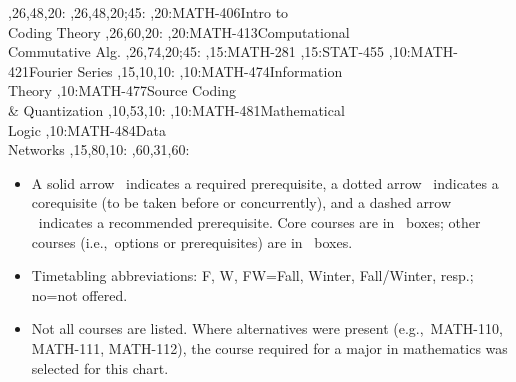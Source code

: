 \documentclass[9pt]{extarticle}
\begin{document}
\begin{chart}
  ,26,48,20:
  ,26,48,20;45:
,20:{MATH-406}{Intro to\\Coding Theory}{}
  ,26,60,20:
,20:{MATH-413}{Computational\\Commutative Alg.}{}
  ,26,74,20;45:
,15:{MATH-281}
,15:{STAT-455}
,10:{MATH-421}{Fourier Series}{}
  ,15,10,10:
,10:{MATH-474}{Information\\Theory}{}
,10:{MATH-477}{Source Coding\\\& Quantization}{}
  ,10,53,10:
,10:{MATH-481}{Mathematical\\Logic}{}
,10:{MATH-484}{Data\\Networks}{}
  ,15,80,10:
  ,60,31,60:
\end{chart}
\begin{center}
\begin{minipage}{6.0in}
\begin{itemize}
\item
A solid arrow \solidarrow\  indicates a required prerequisite,
a dotted arrow \dottedarrow\
indicates a corequisite (to be taken before or concurrently), and a
dashed arrow \dashedarrow\ indicates a recommended prerequisite.
Core courses are in \boldbox\ boxes;
other courses (i.e.,~options or prerequisites)
are in \lightbox\ boxes.
\item Timetabling abbreviations: F, W, FW=Fall, Winter, Fall/Winter, resp.;
  no=not offered.
\item Not all courses are listed. Where alternatives were present
(e.g.,~MATH-110, MATH-111, MATH-112), the course required for a major in
mathematics was selected for this chart.
\end{itemize}
\end{minipage}
\end{center}
\end{document}
